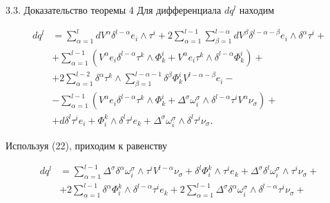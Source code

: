 \begin{pf*}{3.3. Доказательство теоремы 4}
Для дифференциала $dq^l$ находим


\begin{align*}


dq^l&=\sum_{\alpha=1}^{l}dV^{\alpha}\delta^{l-\alpha}e_i\wedge\tau^i+


2\sum_{\alpha=1}^{l-1}\sum_{\beta=1}^{l-\alpha}dV^{\beta}


\delta^{l-\alpha-\beta}e_i\wedge\delta^{\alpha}\tau^i+\\


&+\sum_{\alpha=1}^{l-1}(V^{\alpha}e_i\delta^{l-\alpha}\tau^k\wedge


\Phi^i_k+V^{\alpha}e_i\tau^k\wedge\delta^{l-\alpha}\Phi^i_k)+\\


&+2\sum_{\alpha=1}^{l-2}\delta^{\alpha}\tau^k\wedge


\sum_{\beta=1}^{l-\alpha-1}\delta^{\beta}\Phi^i_kV^{l-\alpha-\beta}e_i-\\


&-\sum_{\alpha=1}^{l-1}(V^{\alpha}e_i\delta^{l-\alpha}\tau^k\wedge


\Phi^i_k+\Delta^{\sigma}\omega^{\sigma}_i\wedge\delta^{l-\alpha}


\tau^iV^{\alpha}\nu_{\sigma})+\\


&+d\delta^l\tau^ie_i+


\Phi^k_i\wedge\delta^l\tau^ie_k+


\Delta^{\sigma}\omega^{\sigma}_i\wedge\delta^l\tau^i\nu_{\sigma}.


\end{align*}


Используя (22), приходим к равенству


\begin{align*}


dq^l&=\sum_{\alpha=1}^{l-1}\Delta^{\sigma}\delta^{\alpha}


\omega^{\sigma}_i\wedge\tau^iV^{l-\alpha}\nu_{\sigma}+


\delta^l\Phi^k_i\wedge\tau^ie_k+


\Delta^{\sigma}\delta^l\omega^{\sigma}_i\wedge\tau^i\nu_{\sigma}+\\


&+2\sum_{\alpha=1}^{l-1}\delta^{\alpha}\Phi^k_i\wedge\delta^{l-\alpha}


\tau^ie_k+


2\sum_{\alpha=1}^{l-1}\Delta^{\sigma}\delta^{\alpha}\omega^{\sigma}_i


\wedge\delta^{l-\alpha}\tau^i\nu_{\sigma}+\\



\end{align*}
\end{pf*}
